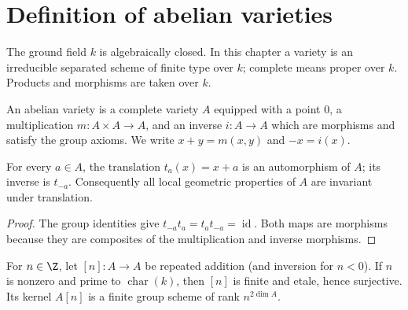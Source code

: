 \section{Definition of abelian varieties}
\label{mumford-II4}

\begin{convention}
\label{mumford-conv-variety-field}
The ground field $k$ is algebraically closed.  In this chapter a variety is an
irreducible separated scheme of finite type over $k$; complete means proper
over $k$.  Products and morphisms are taken over $k$.
\notready
\end{convention}

\begin{definition}
\label{mumford-def-abelian-variety}
An abelian variety is a complete variety $A$ equipped with a point $0$, a
multiplication $m:A\times A\to A$, and an inverse $i:A\to A$ which are
morphisms and satisfy the group axioms.  We write $x+y=m(x,y)$ and
$-x=i(x)$.
\notready
\end{definition}

\begin{lemma}[Translations]
\label{mumford-lem-abelian-translations}
For every $a\in A$, the translation $t_a(x)=x+a$ is an automorphism of $A$;
its inverse is $t_{-a}$.  Consequently all local geometric properties of $A$
are invariant under translation.
\begin{proof}
The group identities give $t_{-a}t_a=t_at_{-a}=\operatorname{id}$.  Both maps
are morphisms because they are composites of the multiplication and inverse
morphisms.
\end{proof}
\notready
\end{lemma}

\begin{proposition}
\label{mumford-prop-multiplication-n}
For $n\in\Z$, let $[n]:A\to A$ be repeated addition (and inversion for
$n<0$).  If $n$ is nonzero and prime to $\operatorname{char}(k)$, then $[n]$
is finite and etale, hence surjective.  Its kernel $A[n]$ is a finite group
scheme of rank $n^{2\dim A}$.
\notready
\end{proposition}

